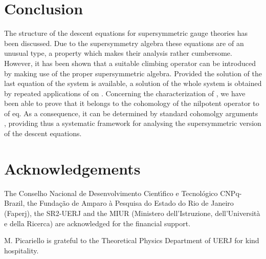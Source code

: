 \documentclass[a4paper,12pt]{article}
\begin{document}
\section{Conclusion}

The structure of the descent equations for supersymmetric gauge theories has
been discussed. Due to the supersymmetry algebra \myHighlight{$\left( \ref{salg}\right) ,$}\coordHE{}
these equations are of an unusual type, a property which makes their
analysis rather cumbersome. However, it has been shown that a suitable
climbing operator \coordHE{} can be introduced by making use of
the proper supersymmetric algebra. Provided the solution \coordHE{} of the last equation of the system \myHighlight{$\left( \ref{sde}%
\right) $}\coordHE{} is available, a solution of the whole system is obtained by
repeated applications of \coordHE{} on \coordHE{}. Concerning the characterization of \coordHE{}, we have been able to prove that it belongs to the cohomology
of the nilpotent operator to \coordHE{} of eq.\coordHE{} As a consequence, it can be determined by standard cohomolgy
arguments \cite{book,pr}, providing thus a systematic framework for
analysing the supersymmetric version of the descent equations.

\section*{Acknowledgements}

The Conselho Nacional de Desenvolvimento Cient\'{\i }fico e Tecnol\'{o}gico
CNPq-Brazil, the Funda{\c{c}}{\~{a}}o de Amparo {\`{a}} Pesquisa do Estado
do Rio de Janeiro (Faperj), the SR2-UERJ and the MIUR (Ministero
dell'Istruzione, dell'Universit\`{a} e della Ricerca) are acknowledged for
the financial support. 

M. Picariello is grateful to the Theoretical Physics Department of UERJ for
kind hospitality.
\end{document}
